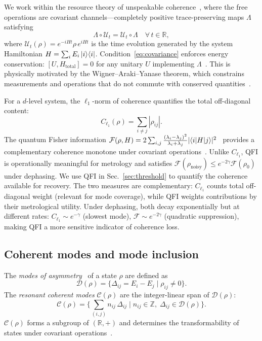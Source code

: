 \documentclass[a4paper,twocolumn]{quantumarticle}
\begin{document}
We work within the resource theory of unspeakable coherence~\cite{Shiraishi2024,Marvian2013,Marvian2014,Lostaglio2019}, where the free operations are covariant channels---completely positive trace-preserving maps $\Lambda$ satisfying
\begin{equation}
\Lambda \circ \mathcal{U}_t = \mathcal{U}_t \circ \Lambda \quad \forall\, t \in \mathbb{R},
\label{eq:covariance}
\end{equation}
where $\mathcal{U}_t(\rho) = e^{-iHt} \rho\, e^{iHt}$ is the time evolution generated by the system Hamiltonian $H = \sum_i E_i \ket{i}\!\bra{i}$.
Condition~\eqref{eq:covariance} enforces energy conservation: $[U, H_\mathrm{total}] = 0$ for any unitary $U$ implementing $\Lambda$~\cite{Marvian2014}.
This is physically motivated by the Wigner--Araki--Yanase theorem, which constrains measurements and operations that do not commute with conserved quantities~\cite{Wigner1952}.

For a $d$-level system, the $\ell_1$-norm of coherence quantifies the total off-diagonal content:
\begin{equation}
C_{\ell_1}(\rho) = \sum_{i \neq j} |\rho_{ij}|.
\label{eq:l1coherence}
\end{equation}
The quantum Fisher information $\mathcal{F}(\rho, H) = 2 \sum_{i,j} \frac{(\lambda_i - \lambda_j)^2}{\lambda_i + \lambda_j} |\!\braket{i|H|j}\!|^2$~\cite{Braunstein1994} provides a complementary coherence monotone under covariant operations~\cite{Shiraishi2024}.
Unlike $C_{\ell_1}$, QFI is operationally meaningful for metrology and satisfies $\mathcal{F}(\rho_\mathrm{noisy}) \leq e^{-2\gamma} \mathcal{F}(\rho_0)$ under dephasing.
We use QFI in Sec.~\ref{sec:threshold} to quantify the coherence available for recovery.
The two measures are complementary: $C_{\ell_1}$ counts total off-diagonal weight (relevant for mode coverage), while QFI weights contributions by their metrological utility.
Under dephasing, both decay exponentially but at different rates: $C_{\ell_1} \sim e^{-\gamma}$ (slowest mode), $\mathcal{F} \sim e^{-2\gamma}$ (quadratic suppression), making QFI a more sensitive indicator of coherence loss.


\subsection{Coherent modes and mode inclusion}
\label{sec:modes}

The \emph{modes of asymmetry}~\cite{Lostaglio2019,Marvian2013} of a state $\rho$ are defined as
\begin{equation}
\mathcal{D}(\rho) = \bigl\{ \Delta_{ij} = E_i - E_j \mid \rho_{ij} \neq 0 \bigr\}.
\label{eq:modes}
\end{equation}
The \emph{resonant coherent modes} $\mathcal{C}(\rho)$ are the integer-linear span of $\mathcal{D}(\rho)$:
\begin{equation}
\mathcal{C}(\rho) = \biggl\{ \sum_{(i,j)} n_{ij}\, \Delta_{ij} \;\bigg|\; n_{ij} \in \mathbb{Z},\; \Delta_{ij} \in \mathcal{D}(\rho) \biggr\}.
\label{eq:resonant_modes}
\end{equation}
$\mathcal{C}(\rho)$ forms a subgroup of $(\mathbb{R}, +)$ and determines the transformability of states under covariant operations~\cite{Shiraishi2024}.
\end{document}
